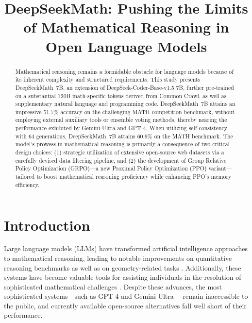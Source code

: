\title{DeepSeekMath: Pushing the Limits of Mathematical Reasoning in Open Language Models}

\begin{abstract}
Mathematical reasoning remains a formidable obstacle for language models because of its inherent complexity and structured requirements. This study presents DeepSeekMath~7B, an extension of DeepSeek-Coder-Base-v1.5 7B, further pre-trained on a substantial 120B math-specific tokens derived from Common Crawl, as well as supplementary natural language and programming code. DeepSeekMath~7B attains an impressive 51.7\% accuracy on the challenging MATH competition benchmark, without employing external auxiliary tools or ensemble voting methods, thereby nearing the performance exhibited by Gemini-Ultra and GPT-4. When utilizing self-consistency with 64 generations, DeepSeekMath~7B attains 60.9\% on the MATH benchmark. The model’s prowess in mathematical reasoning is primarily a consequence of two critical design choices: (1) strategic utilization of extensive open-source web datasets via a carefully devised data filtering pipeline, and (2) the development of Group Relative Policy Optimization (GRPO)—a new Proximal Policy Optimization (PPO) variant—tailored to boost mathematical reasoning proficiency while enhancing PPO’s memory efficiency.
\end{abstract}

\section{Introduction}

Large language models (LLMs) have transformed artificial intelligence approaches to mathematical reasoning, leading to notable improvements on quantitative reasoning benchmarks \citep{MATH} as well as on geometry-related tasks \citep{trinh2024solving}. Additionally, these systems have become valuable tools for assisting individuals in the resolution of sophisticated mathematical challenges \citep{tao}. Despite these advances, the most sophisticated systems—such as GPT-4 \citep{gpt4} and Gemini-Ultra \citep{gemini}—remain inaccessible to the public, and currently available open-source alternatives fall well short of their performance.

